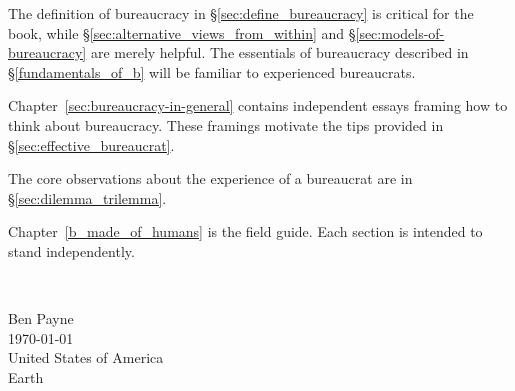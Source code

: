 

The definition of bureaucracy in \S\ref{sec:define_bureaucracy} is critical for the book, while \S\ref{sec:alternative_views_from_within} and \S\ref{sec:models-of-bureaucracy} are merely helpful. The essentials of bureaucracy described in \S\ref{fundamentals_of_b} will be familiar to experienced bureaucrats. 

Chapter~\ref{sec:bureaucracy-in-general} contains independent essays framing how to think about bureaucracy. 
These framings motivate the tips provided in \S\ref{sec:effective_bureaucrat}.

The core observations about the experience of a bureaucrat are in \S\ref{sec:dilemma_trilemma}. 

Chapter~\ref{b_made_of_humans} is the field guide. Each section is intended to stand independently. %

\ \\

\begin{flushright}
Ben Payne\\
\today\\
United States of America\\
Earth
\end{flushright}


